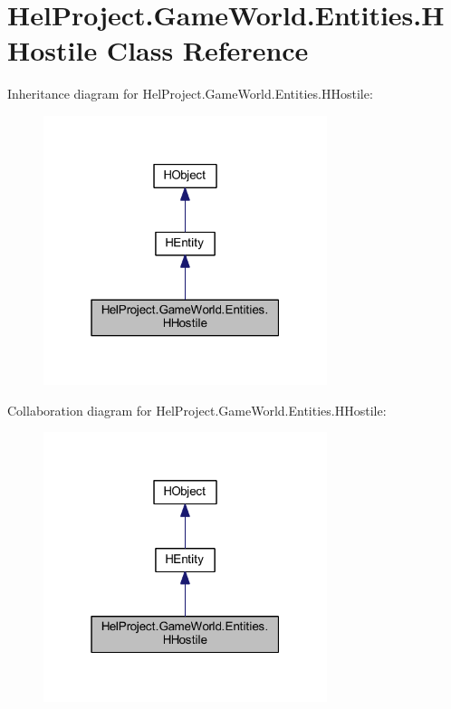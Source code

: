 \hypertarget{class_hel_project_1_1_game_world_1_1_entities_1_1_h_hostile}{}\section{Hel\+Project.\+Game\+World.\+Entities.\+H\+Hostile Class Reference}
\label{class_hel_project_1_1_game_world_1_1_entities_1_1_h_hostile}


Inheritance diagram for Hel\+Project.\+Game\+World.\+Entities.\+H\+Hostile\+:
\nopagebreak
\begin{figure}[H]
\begin{center}
\leavevmode
\includegraphics[width=235pt]{class_hel_project_1_1_game_world_1_1_entities_1_1_h_hostile__inherit__graph}
\end{center}
\end{figure}


Collaboration diagram for Hel\+Project.\+Game\+World.\+Entities.\+H\+Hostile\+:
\nopagebreak
\begin{figure}[H]
\begin{center}
\leavevmode
\includegraphics[width=235pt]{class_hel_project_1_1_game_world_1_1_entities_1_1_h_hostile__coll__graph}
\end{center}
\end{figure}
